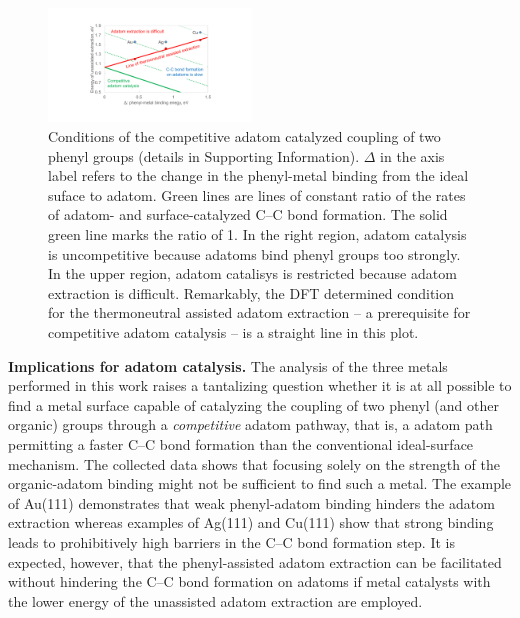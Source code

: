 \documentclass[aps,prb,amsmath,amssymb,11pt]{revtex4-1}
\newcommand{\sinfo}{Supporting Information}
\begin{document}
\begin{figure}[bt]
\centering
\includegraphics[width=0.48\textwidth]{Fig/conclusion.pdf}
\caption{Conditions of the competitive adatom catalyzed coupling of two phenyl groups (details in \sinfo). $\Delta$ in the axis label refers to the change in the phenyl-metal binding from the ideal suface to adatom. Green lines are lines of constant ratio of the rates of adatom- and surface-catalyzed C--C bond formation. The solid green line marks the ratio of 1. In the right region, adatom catalysis is uncompetitive because adatoms bind phenyl groups too strongly.  In the upper region, adatom catalisys is restricted because adatom extraction is difficult. Remarkably, the DFT determined condition for the thermoneutral assisted adatom extraction -- a prerequisite for competitive adatom catalysis -- is a straight line in this plot.} 
\label{fig:conclusion}
\end{figure}

\textbf{Implications for adatom catalysis.} 
%
The analysis of the three metals performed in this work raises a tantalizing question whether it is at all possible to find a metal surface capable of catalyzing the coupling of two phenyl (and other organic) groups through a \emph{competitive} adatom pathway, that is, a adatom path permitting a faster C--C bond formation than the conventional ideal-surface mechanism. 
The collected data shows that focusing solely on the strength of the organic-adatom binding might not be sufficient to find such a metal. The example of Au(111) demonstrates that weak phenyl-adatom binding hinders the adatom extraction whereas examples of Ag(111) and Cu(111) show that strong binding leads to prohibitively high barriers in the C--C bond formation step. It is expected, however, that the phenyl-assisted adatom extraction can be facilitated without hindering the C--C bond formation on adatoms if metal catalysts with the lower energy of the unassisted adatom extraction are employed. 
\end{document}
